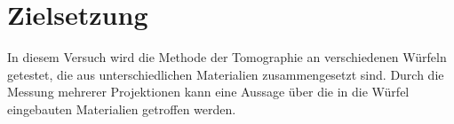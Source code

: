 \section{Zielsetzung}
\label{sec:Zielsetzung}


        In diesem Versuch wird die Methode der Tomographie an verschiedenen Würfeln 
        getestet, die aus unterschiedlichen Materialien zusammengesetzt sind. 
        Durch die Messung mehrerer Projektionen kann eine Aussage über die 
        in die Würfel eingebauten Materialien getroffen werden.
